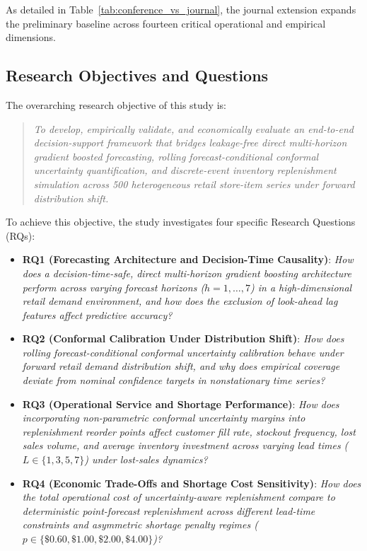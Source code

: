 As detailed in Table~\ref{tab:conference_vs_journal}, the journal extension expands the preliminary baseline across fourteen critical operational and empirical dimensions.

\subsection{Research Objectives and Questions}
The overarching research objective of this study is:

\begin{quote}
\textit{To develop, empirically validate, and economically evaluate an end-to-end decision-support framework that bridges leakage-free direct multi-horizon gradient boosted forecasting, rolling forecast-conditional conformal uncertainty quantification, and discrete-event inventory replenishment simulation across 500 heterogeneous retail store-item series under forward distribution shift.}
\end{quote}

To achieve this objective, the study investigates four specific Research Questions (RQs):

\begin{itemize}
    \item \textbf{RQ1 (Forecasting Architecture and Decision-Time Causality)}: \textit{How does a decision-time-safe, direct multi-horizon gradient boosting architecture perform across varying forecast horizons ($h=1,\dots,7$) in a high-dimensional retail demand environment, and how does the exclusion of look-ahead lag features affect predictive accuracy?}
    \item \textbf{RQ2 (Conformal Calibration Under Distribution Shift)}: \textit{How does rolling forecast-conditional conformal uncertainty calibration behave under forward retail demand distribution shift, and why does empirical coverage deviate from nominal confidence targets in nonstationary time series?}
    \item \textbf{RQ3 (Operational Service and Shortage Performance)}: \textit{How does incorporating non-parametric conformal uncertainty margins into replenishment reorder points affect customer fill rate, stockout frequency, lost sales volume, and average inventory investment across varying lead times ($L \in \{1, 3, 5, 7\}$) under lost-sales dynamics?}
    \item \textbf{RQ4 (Economic Trade-Offs and Shortage Cost Sensitivity)}: \textit{How does the total operational cost of uncertainty-aware replenishment compare to deterministic point-forecast replenishment across different lead-time constraints and asymmetric shortage penalty regimes ($p \in \{\$0.60, \$1.00, \$2.00, \$4.00\}$)?}
\end{itemize}

